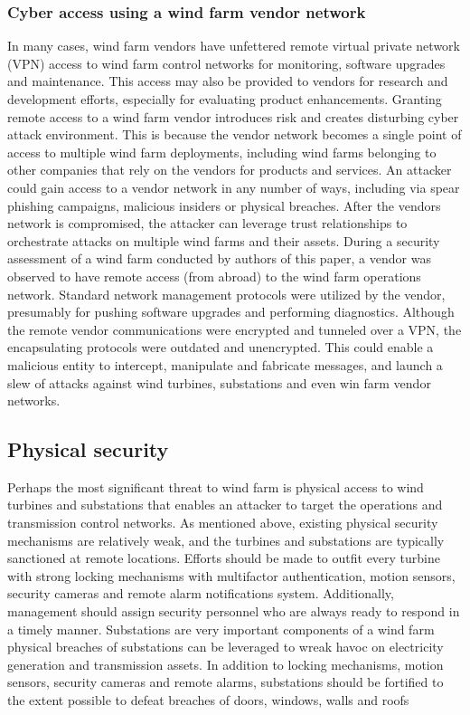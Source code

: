 \documentclass[twosided,a4,10pt]{article}
\begin{document}
\begin{multicols}{2}
 \subsubsection{Cyber access using a wind farm vendor network}
 In many cases, wind farm vendors have unfettered remote virtual private network (VPN) access to wind farm control networks for monitoring, software upgrades and maintenance. This access may also be provided to vendors for research and development efforts, especially for evaluating product enhancements. Granting remote access to a wind farm vendor introduces risk and creates disturbing cyber attack environment. This is because the vendor network becomes a single point of access to multiple wind farm deployments, including wind farms belonging to other companies that rely on the vendors for products and services. An attacker could gain access to a vendor network in any number of ways, including via spear phishing campaigns, malicious insiders or physical breaches. After the vendors network is compromised, the attacker can leverage trust relationships to orchestrate attacks on multiple wind farms and their assets. During a security assessment of a wind farm conducted by authors of this paper, a vendor was observed to have remote access (from abroad) to the wind farm operations network. Standard network management protocols were utilized by the vendor, presumably for pushing software upgrades and performing diagnostics. Although the remote vendor communications were encrypted and tunneled over a VPN, the encapsulating protocols were outdated and unencrypted. This could enable a malicious entity to intercept, manipulate and fabricate messages, and launch a slew of attacks against wind turbines, substations and even win farm vendor networks.
 

\subsection{Physical security} 
Perhaps the most significant threat to wind farm is physical access to wind turbines and substations that enables an attacker to target the operations and transmission control networks. As mentioned above, existing physical security mechanisms are relatively weak, and the turbines and substations are typically sanctioned at remote locations. Efforts should be made to outfit every turbine with strong locking mechanisms with multifactor authentication, motion sensors, security cameras and remote alarm notifications system. Additionally, management should assign security personnel who are always ready to respond in a timely manner. Substations are very important components of a wind farm physical breaches of substations can be leveraged to wreak havoc on electricity generation and transmission assets. In addition to locking mechanisms, motion sensors, security cameras and remote alarms, substations should be fortified to the extent possible to defeat breaches of doors, windows, walls and roofs
 
 
\end{multicols}
\end{document}
